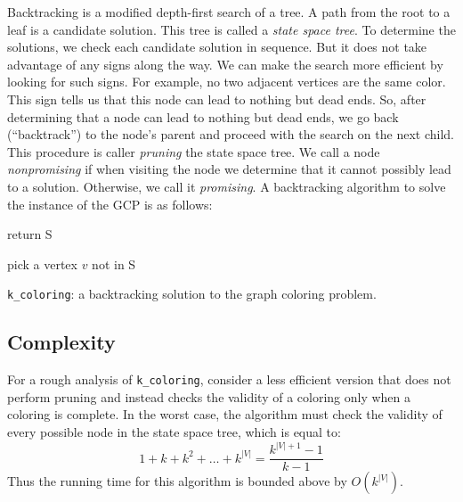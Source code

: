 \documentclass{article}
\begin{document}
Backtracking is a modified depth-first search of a tree.  A path from the root to a leaf is a candidate solution. This tree is called a \emph{state space tree}. To determine the solutions, we check each candidate solution in sequence. But it does not take advantage of any signs along the way. We can make the search more efficient by looking for such signs. For example, no two adjacent vertices are the same color. This sign tells us that this node can lead to nothing but dead ends. So, after determining that a node can lead to nothing but dead ends, we go back (``backtrack'') to the node's parent and proceed with the search on the next child. This procedure is caller \emph{pruning} the state space tree.  We call a node \emph{nonpromising} if when visiting the node we determine that  it cannot possibly lead to a solution. Otherwise, we call it \emph{promising}.  
A backtracking algorithm to solve the instance of the GCP is as follows: 
\begin{algorithm}[H]
\DontPrintSemicolon %
 {
    return S\;
} {
 	pick a vertex $v$ not in S\;
 
}
\caption{{\texttt{k\_coloring}:} a backtracking solution to the graph coloring problem.}
\label{algo:coloring}
\end{algorithm}


 



\subsection{Complexity}



For a rough analysis of \texttt{k\_coloring}, consider a less efficient version that does not perform pruning and instead checks the validity of a coloring only when a coloring
is complete. In the worst case, the algorithm must check the validity of every possible node in the state space tree, which is equal to:
\begin{equation}
1 + k + k^2 + \dots + k^{|V|} = \frac{k^{|V|+1}-1}{k-1}
\end{equation}
Thus the running time for this algorithm is bounded above by $O(k^{|V|})$. 
\end{document}
